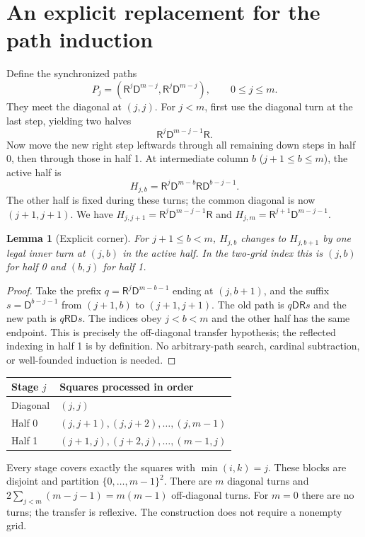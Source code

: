\documentclass[11pt]{article}
\newtheorem{lemma}[theorem]{Lemma}
\newcommand{\RR}{\mathsf R}
\newcommand{\DD}{\mathsf D}
\begin{document}
\section{An explicit replacement for the path induction}
Define the synchronized paths
\[
P_j=(\RR^j\DD^{m-j},\RR^j\DD^{m-j}),\qquad 0\le j\le m.
\]
They meet the diagonal at $(j,j)$. For $j<m$, first use the diagonal turn at the last step, yielding two halves
\[
\RR^j\DD^{m-j-1}\RR.
\]
Now move the new right step leftwards through all remaining down steps in half 0, then through those in half 1. At intermediate column $b$ ($j+1\le b\le m$), the active half is
\begin{equation}\label{eq:half}
H_{j,b}=\RR^j\DD^{m-b}\RR\DD^{b-j-1}.
\end{equation}
The other half is fixed during these turns; the common diagonal is now $(j+1,j+1)$. We have $H_{j,j+1}=\RR^j\DD^{m-j-1}\RR$ and $H_{j,m}=\RR^{j+1}\DD^{m-j-1}$.

\begin{lemma}[Explicit corner]\label{lem:corner}
For $j+1\le b<m$, $H_{j,b}$ changes to $H_{j,b+1}$ by one legal inner turn at $(j,b)$ in the active half. In the two-grid index this is $(j,b)$ for half 0 and $(b,j)$ for half 1.
\end{lemma}
\begin{proof}
Take the prefix $q=\RR^j\DD^{m-b-1}$ ending at $(j,b+1)$, and the suffix $s=\DD^{b-j-1}$ from $(j+1,b)$ to $(j+1,j+1)$. The old path is $q\DD\RR s$ and the new path is $q\RR\DD s$. The indices obey $j<b<m$ and the other half has the same endpoint. This is precisely the off-diagonal transfer hypothesis; the reflected indexing in half 1 is by definition. No arbitrary-path search, cardinal subtraction, or well-founded induction is needed.
\end{proof}

\begin{center}
\begin{tabular}{@{}ll@{}}
\toprule
Stage $j$ & Squares processed in order \\
\midrule
Diagonal & $(j,j)$ \\
Half 0 & $(j,j+1),(j,j+2),\ldots,(j,m-1)$ \\
Half 1 & $(j+1,j),(j+2,j),\ldots,(m-1,j)$ \\
\bottomrule
\end{tabular}
\end{center}
Every stage covers exactly the squares with $\min(i,k)=j$. These blocks are disjoint and partition $\{0,\dots,m-1\}^2$. There are $m$ diagonal turns and $2\sum_{j<m}(m-j-1)=m(m-1)$ off-diagonal turns. For $m=0$ there are no turns; the transfer is reflexive. The construction does not require a nonempty grid.
\end{document}
